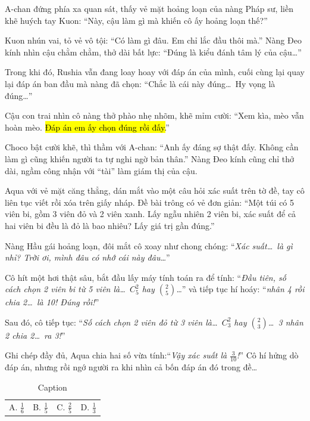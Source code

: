 \documentclass[../main.tex]{subfiles}
\begin{document}
A-chan đứng phía xa quan sát, thấy vẻ mặt hoảng loạn của nàng Pháp sư, liền khẽ huých tay Kuon: ``Này, cậu làm gì mà khiến cô ấy hoảng loạn thế?''

Kuon nhún vai, tỏ vẻ vô tội: ``Có làm gì đâu. Em chỉ lắc đầu thôi mà.'' Nàng Đeo kính nhìn cậu chằm chằm, thở dài bất lực: ``Đúng là kiểu đánh tâm lý của cậu\dots''

Trong khi đó, Rushia vẫn đang loay hoay với đáp án của mình, cuối cùng lại quay lại đáp án ban đầu mà nàng đã chọn: ``Chắc là cái này đúng\dots\ Hy vọng là đúng\dots''

Cậu con trai nhìn cô nàng thở phào nhẹ nhõm, khẽ mỉm cười: ``Xem kìa, mèo vẫn hoàn mèo. \hl{Đáp án em ấy chọn đúng rồi đấy.}''

Choco bật cười khẽ, thì thầm với A-chan: ``Anh ấy đáng sợ thật đấy. Không cần làm gì cũng khiến người ta tự nghi ngờ bản thân.'' Nàng Đeo kính cũng chỉ thở dài, ngầm công nhận với ``tài'' làm giám thị của cậu.

\ct

Aqua với vẻ mặt căng thẳng, dán mắt vào một câu hỏi xác suất trên tờ đề, tay cô liên tục viết rồi xóa trên giấy nháp. Đề bài trông có vẻ đơn giản: ``Một túi có 5 viên bi, gồm 3 viên đỏ và 2 viên xanh. Lấy ngẫu nhiên 2 viên bi, xác suất để cả hai viên bi đều là đỏ là bao nhiêu? Lấy giá trị gần đúng.''

Nàng Hầu gái hoảng loạn, đôi mắt cô xoay như chong chóng: ``\textit{Xác suất\dots\ là gì nhỉ? Trời ơi, mình đâu có nhớ cái này đâu\dots}''

Cô hít một hơi thật sâu, bắt đầu lấy máy tính toán ra để tính: ``\textit{Đầu tiên, số cách chọn 2 viên bi từ 5 viên là\dots\ \(C^2_5\) hay \(\binom{2}{5}\)\dots}'' và tiếp tục hí hoáy: ``\textit{nhân 4 rồi chia 2\dots\ là 10! Đúng rồi!}''

Sau đó, cô tiếp tục: ``\textit{Số cách chọn 2 viên đỏ từ 3 viên là\dots\ \(C^2_3\) hay \(\binom{2}{3}\)\dots\ 3 nhân 2 chia 2\dots\ ra 3!}''

Ghi chép đầy đủ, Aqua chia hai số vừa tính:``\textit{Vậy xác suất là \(\frac{3}{10}\)!}'' Cô hí hửng dò đáp án, nhưng rồi ngớ người ra khi nhìn cả bốn đáp án đó trong đề\dots

\begin{table}[H]
    \begin{tabular}{>{\arraybackslash}p{0.25\linewidth}>{\arraybackslash}p{0.25\linewidth}>{\arraybackslash}p{0.25\linewidth}>{\arraybackslash}p{0.25\linewidth}}
        A. \(\frac{1}{6}\) & B. \(\frac{1}{5}\) & C. \(\frac{2}{5}\) & D. \(\frac{1}{3}\) \\
    \end{tabular}
    \caption{Caption}
\end{table}
\end{document}
